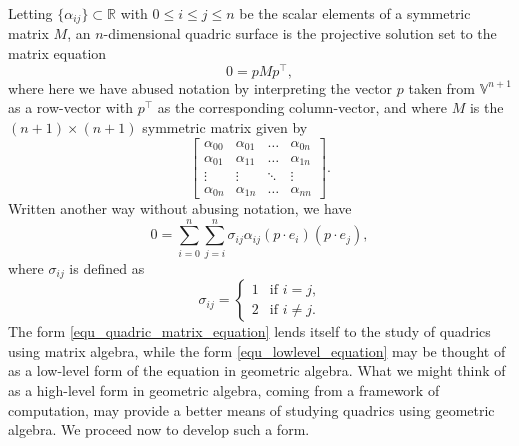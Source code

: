 \documentclass{ecgd-l}
\theoremstyle{definition}
\theoremstyle{remark}
\numberwithin{equation}{section}
\newcommand{\V}{\mathbb{V}}
\newcommand{\R}{\mathbb{R}}
\begin{document}
Letting $\{\alpha_{ij}\}\subset\R$ with $0\leq i\leq j\leq n$ be the scalar elements of a symmetric
matrix $M$, an $n$-dimensional quadric surface is the projective solution set to the
matrix equation
\begin{equation}\label{equ_quadric_matrix_equation}
0 = pMp^\intercal,
\end{equation}
where here we have abused notation by interpreting the vector $p$ taken from $\V^{n+1}$ as
a row-vector with $p^\intercal$ as the corresponding column-vector, and where $M$ is the
$(n+1)\times(n+1)$ symmetric matrix given by
\begin{equation}
\left[\begin{array}{cccc}
\alpha_{00} & \alpha_{01} & \dots & \alpha_{0n} \\
\alpha_{01} & \alpha_{11} & \dots & \alpha_{1n} \\
\vdots & \vdots & \ddots & \vdots \\
\alpha_{0n} & \alpha_{1n} & \dots & \alpha_{nn}
\end{array}\right].
\end{equation}
Written another way without abusing notation, we have
\begin{equation}\label{equ_lowlevel_equation}
0 = \sum_{i=0}^n\sum_{j=i}^n\sigma_{ij}\alpha_{ij}(p\cdot e_i)(p\cdot e_j),
\end{equation}
where $\sigma_{ij}$ is defined as
\begin{equation}
\sigma_{ij} = \left\{\begin{array}{ll}
1 & \mbox{if $i=j$,} \\
2 & \mbox{if $i\neq j$.}
\end{array}\right.
\end{equation}
The form \eqref{equ_quadric_matrix_equation} lends itself to the study
of quadrics using matrix algebra, while the form \eqref{equ_lowlevel_equation}
may be thought of as a low-level form of the equation in geometric algebra.
What we might think of as a high-level form in geometric algebra, coming from
a framework of computation, may provide a better means of studying quadrics
using geometric algebra.  We proceed now to develop such a form.
\end{document}
